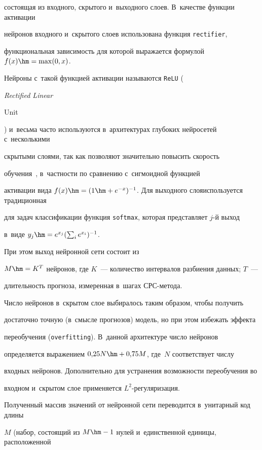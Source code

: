 состоящая из входного, скрытого и~выходного слоев. В~качестве функции активации 


нейронов входного и~скрытого слоев использована функция \verb"rectifier", 


функциональная зависимость для которой выражается формулой $f(x) \hm= \max(0, x)$. 


Нейроны с~такой функцией активации называются \verb"ReLU" ({\em Rectified Linear 


Unit}) и~весьма часто используются в~архитектурах глубоких нейросетей с~несколькими 


скрытыми слоями, так как поз\-воляют значительно повысить скорость\linebreak 


обучения~\cite{Glorot2011}, в~част\-ности по сравнению с~сигмоидной функцией 


активации вида $f(x) \hm=(1\hm+e^{-x})^{-1}$. Для выходного слоя\linebreak используется традиционная 


для задач классификации функция \verb"softmax", которая представляет $j$-й выход 


в~виде $y_j\hm=e^{x_j} (\sum\nolimits_i e^{x_i})^{-1}$. 


При этом выход нейронной сети со\-сто\-ит из 


$M\hm=K^T$ нейронов, где $K$~--- количество интервалов разбиения данных; $T$~--- 


длительность прогноза, измеренная в~шагах СРС-ме\-тода.





Число нейронов в~скрытом слое выбиралось таким образом, чтобы получить 


достаточно точную (в~смысле прогнозов) модель, но при этом избежать эффекта 


переобучения (\verb"overfitting"). В~данной архитектуре число нейронов 


определяется выражением $0{,}25N\hm+ 0{,}75M$, где~$N$ соответствует числу 


входных нейронов.  Дополнительно для устранения возможности переобучения во 


входном и~скрытом слое применяется $L^2$-регуляризация.





Полученный массив значений от нейронной сети переводится в~унитарный код длины 


$M$ (набор, со\-сто\-ящий из $M\hm-1$ нулей и~единственной единицы, расположенной 


